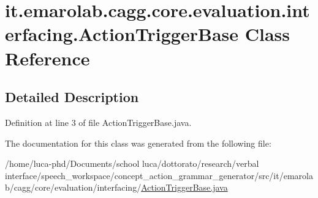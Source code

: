 \hypertarget{classit_1_1emarolab_1_1cagg_1_1core_1_1evaluation_1_1interfacing_1_1ActionTriggerBase}{\section{it.\-emarolab.\-cagg.\-core.\-evaluation.\-interfacing.\-Action\-Trigger\-Base Class Reference}
\label{classit_1_1emarolab_1_1cagg_1_1core_1_1evaluation_1_1interfacing_1_1ActionTriggerBase}
}


\subsection{Detailed Description}


Definition at line 3 of file Action\-Trigger\-Base.\-java.



The documentation for this class was generated from the following file\-:\begin{DoxyCompactItemize}
\item 
/home/luca-\/phd/\-Documents/school luca/dottorato/research/verbal interface/speech\-\_\-workspace/concept\-\_\-action\-\_\-grammar\-\_\-generator/src/it/emarolab/cagg/core/evaluation/interfacing/\hyperlink{ActionTriggerBase_8java}{Action\-Trigger\-Base.\-java}\end{DoxyCompactItemize}
